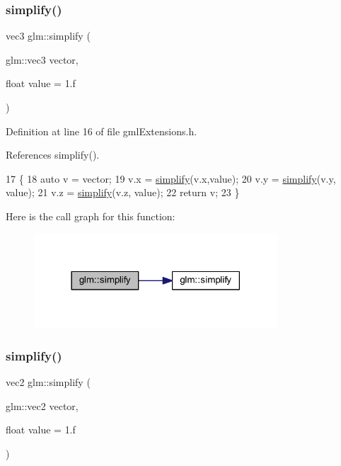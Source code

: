 \subsubsection{\texorpdfstring{simplify()}{simplify()}\hspace{0.1cm}{\footnotesize\ttfamily [2/3]}}
{\footnotesize\ttfamily vec3 glm\+::simplify (\begin{DoxyParamCaption}\item[{glm\+::vec3}]{vector,  }\item[{float}]{value = {\ttfamily 1.f} }\end{DoxyParamCaption})\hspace{0.3cm}{\ttfamily [inline]}}



Definition at line 16 of file gml\+Extensions.\+h.



References simplify().


\begin{DoxyCode}
17     \{
18         \textcolor{keyword}{auto} v = vector;
19         v.x = \mbox{\hyperlink{namespaceglm_a091978f9c1c830d7388c42251c59dad4}{simplify}}(v.x,value);
20         v.y = \mbox{\hyperlink{namespaceglm_a091978f9c1c830d7388c42251c59dad4}{simplify}}(v.y, value);
21         v.z = \mbox{\hyperlink{namespaceglm_a091978f9c1c830d7388c42251c59dad4}{simplify}}(v.z, value);
22         \textcolor{keywordflow}{return} v;
23     \}
\end{DoxyCode}
Here is the call graph for this function\+:
\nopagebreak
\begin{figure}[H]
\begin{center}
\leavevmode
\includegraphics[width=258pt]{namespaceglm_a1b1223920ce15b9bc024049ebc24ac25_cgraph}
\end{center}
\end{figure}
\mbox{\label{namespaceglm_a091978f9c1c830d7388c42251c59dad4}} 
\subsubsection{\texorpdfstring{simplify()}{simplify()}\hspace{0.1cm}{\footnotesize\ttfamily [3/3]}}
{\footnotesize\ttfamily vec2 glm\+::simplify (\begin{DoxyParamCaption}\item[{glm\+::vec2}]{vector,  }\item[{float}]{value = {\ttfamily 1.f} }\end{DoxyParamCaption})\hspace{0.3cm}{\ttfamily [inline]}}



